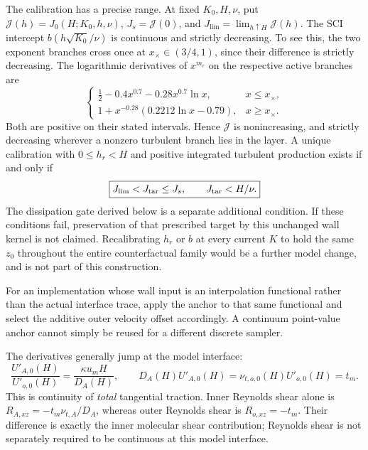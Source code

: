 \documentclass[11pt,a4paper]{article}
\numberwithin{equation}{section}
\begin{document}
The calibration has a precise range. At fixed $K_0,H,\nu$, put
$\mathcal J(h)=J_0(H;K_0,h,\nu)$,
$J_s=\mathcal J(0)$, and
$J_{\lim}=\lim_{h\uparrow H}\mathcal J(h)$.
The SCI intercept $b(h\sqrt{K_0}/\nu)$ is continuous and strictly
decreasing. To see this, the two exponent branches cross once at
$x_\times\in(3/4,1)$, since their difference is strictly decreasing.
The logarithmic derivatives of $x^{m_r}$ on the respective active
branches are
\begin{equation}
 \begin{cases}
 \frac12-0.4x^{0.7}-0.28x^{0.7}\ln x,&x\leq x_\times,\\
 1+x^{-0.28}(0.2212\ln x-0.79),&x\geq x_\times.
 \end{cases}
 \label{awf:roughness-monotonicity}
\end{equation}
Both are positive on their stated intervals. Hence $\mathcal J$
is nonincreasing, and strictly decreasing wherever a nonzero
turbulent branch lies in the layer. A unique calibration with
$0\leq h_r<H$ and positive integrated turbulent production exists
if and only if
\begin{equation}
 \boxed{J_{\lim}<J_{\rm tar}\leq J_s,
 \qquad J_{\rm tar}<H/\nu.}
 \label{awf:roughness-calibration-gate}
\end{equation}
The dissipation gate derived below is a separate additional condition.
If these conditions fail, preservation of that prescribed target by
this unchanged wall kernel is not claimed. Recalibrating $h_r$ or $b$
at every current $K$ to hold the same $z_0$ throughout the entire
counterfactual family would be a further model change, and is not
part of this construction.

For an implementation whose wall input is an interpolation functional
rather than the actual interface trace, apply the anchor to that
same functional and select the additive outer velocity offset
accordingly. A continuum point-value anchor cannot simply be reused
for a different discrete sampler.

The derivatives generally jump at the model interface:
\begin{equation}
 \frac{U'_{A,0}(H)}{U'_{o,0}(H)}
 =\frac{\kappa u_mH}{D_A(H)},\qquad
 \boxed{D_A(H)U'_{A,0}(H)
 =\nu_{t,o,0}(H)U'_{o,0}(H)=t_m.}
 \label{awf:derivative-flux}
\end{equation}
This is continuity of \emph{total} tangential traction. Inner Reynolds
shear alone is
$R_{A,xz}=-t_m\nu_{t,A}/D_A$, whereas outer Reynolds shear is
$R_{o,xz}=-t_m$. Their difference is exactly the inner molecular
shear contribution; Reynolds shear is not separately required to
be continuous at this model interface.
\end{document}
